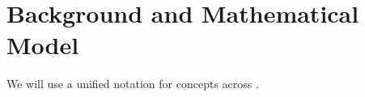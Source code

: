 \chapter{Background and Mathematical Model}
\label{chap:background}


We will use a unified notation for concepts across .



%
%
%
